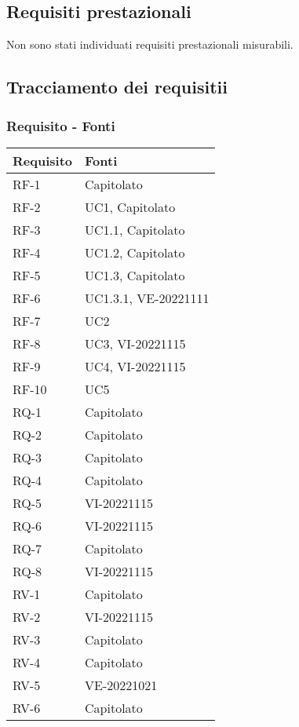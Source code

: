 \subsection{Requisiti prestazionali}
Non sono stati individuati requisiti prestazionali misurabili.


\subsection{Tracciamento dei requisitii}

\subsubsection{Requisito - Fonti}
\begin{tabular}{| p{} | p{} |} 
 \hline
 \textbf{Requisito} & \textbf{Fonti} \\
 \hline
  RF-1 & Capitolato\\
\hline
  RF-2 & UC1, Capitolato\\
\hline
  RF-3 & UC1.1, Capitolato\\
\hline
  RF-4 & UC1.2, Capitolato\\
\hline
  RF-5 & UC1.3, Capitolato\\
\hline
  RF-6 & UC1.3.1, VE-20221111\\
\hline
  RF-7 & UC2\\
\hline
  RF-8 & UC3, VI-20221115\\
\hline
  RF-9 & UC4, VI-20221115\\
\hline
  RF-10 & UC5\\
\hline
  RQ-1 & Capitolato\\
\hline
  RQ-2 & Capitolato\\
\hline
  RQ-3 & Capitolato\\
\hline
  RQ-4 & Capitolato\\
\hline
  RQ-5 & VI-20221115\\
\hline
  RQ-6 & VI-20221115\\
\hline
  RQ-7 & Capitolato\\
\hline
  RQ-8 & VI-20221115\\
\hline
  RV-1 & Capitolato\\
\hline
  RV-2 & VI-20221115\\
\hline
  RV-3 & Capitolato\\
\hline
  RV-4 & Capitolato\\
\hline
  RV-5 & VE-20221021\\
\hline
  RV-6 & Capitolato\\
\hline
\end{tabular}


